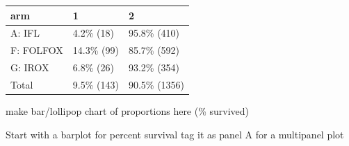 \documentclass[fleqn,10pt,lineno]{wlpeerj} %
\newenvironment{Shaded}{\begin{snugshade}}{\end{snugshade}}
\newcommand{\CommentTok}[1]{\textcolor[rgb]{0.56,0.35,0.01}{\textit{#1}}}
\newcommand{\DataTypeTok}[1]{\textcolor[rgb]{0.13,0.29,0.53}{#1}}
\newcommand{\DecValTok}[1]{\textcolor[rgb]{0.00,0.00,0.81}{#1}}
\newcommand{\KeywordTok}[1]{\textcolor[rgb]{0.13,0.29,0.53}{\textbf{#1}}}
\newcommand{\NormalTok}[1]{#1}
\newcommand{\OperatorTok}[1]{\textcolor[rgb]{0.81,0.36,0.00}{\textbf{#1}}}
\newcommand{\StringTok}[1]{\textcolor[rgb]{0.31,0.60,0.02}{#1}}
\begin{document}
\begin{tabular}{l|l|l}
\hline
arm & 1 & 2\\
\hline
A: IFL & 4.2\%  (18) & 95.8\%  (410)\\
\hline
F: FOLFOX & 14.3\%  (99) & 85.7\%  (592)\\
\hline
G: IROX & 6.8\%  (26) & 93.2\%  (354)\\
\hline
Total & 9.5\% (143) & 90.5\% (1356)\\
\hline
\end{tabular}

\begin{Shaded}
\end{Shaded}

\begin{Shaded}
\end{Shaded}

make bar/lollipop chart of proportions here (\% survived)

Start with a barplot
for percent survival
tag it as panel A for a multipanel plot
\end{document}
